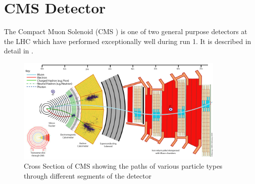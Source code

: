
\chapter{CMS Detector} %

\label{Chapter 2} %


The Compact Muon Solenoid (CMS \cite{CMSTDR}) is one of two general purpose detectors at the LHC which have performed exceptionally well during run 1. It is described in detail in \cite{CMS}. 

\begin{figure}
\centering
    \includegraphics[width=0.9\textwidth]{./Figures/CMS_Slice.jpg}
  \caption{Cross Section of CMS showing the paths of various particle types through different segments of the detector \cite{cmsslice}}
  \label{CMS_SLICE}
\end{figure}

